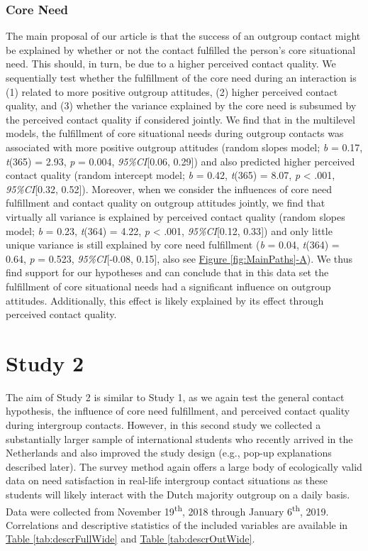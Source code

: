 \documentclass[man, 12pt, a4paper, mask]{apa7}
\theoremstyle{break}
\theoremstyle{plain}
\newcommand{\fgrref}[2][]{\hyperref[#2]{Figure \ref*{#2}#1}}
\newcommand{\tblref}[2][]{\hyperref[#2]{Table \ref*{#2}#1}}
\begin{document}
\subsubsection{Core Need}

The main proposal of our article is that the success of an outgroup
contact might be explained by whether or not the contact fulfilled the
person's core situational need. This should, in turn, be due to a higher
perceived contact quality. We sequentially test whether the fulfillment
of the core need during an interaction is (1) related to more positive
outgroup attitudes, (2) higher perceived contact quality, and (3)
whether the variance explained by the core need is subsumed by the
perceived contact quality if considered jointly. We find that in the
multilevel models, the fulfillment of core situational needs during
outgroup contacts was associated with more positive outgroup attitudes
(random slopes model; \textit{b} = 0.17, \textit{t}(365) = 2.93,
\textit{p} = 0.004, \textit{95\%CI}{[}0.06, 0.29{]}) and also predicted
higher perceived contact quality (random intercept model; \textit{b} =
0.42, \textit{t}(365) = 8.07, \textit{p} \textless{} .001,
\textit{95\%CI}{[}0.32, 0.52{]}). Moreover, when we consider the
influences of core need fulfillment and contact quality on outgroup
attitudes jointly, we find that virtually all variance is explained by
perceived contact quality (random slopes model; \textit{b} = 0.23,
\textit{t}(364) = 4.22, \textit{p} \textless{} .001,
\textit{95\%CI}{[}0.12, 0.33{]}) and only little unique variance is
still explained by core need fulfillment (\textit{b} = 0.04,
\textit{t}(364) = 0.64, \textit{p} = 0.523, \textit{95\%CI}{[}-0.08,
0.15{]}, also see \fgrref[-A]{fig:MainPaths}). We thus find support for
our hypotheses and can conclude that in this data set the fulfillment of
core situational needs had a significant influence on outgroup
attitudes. Additionally, this effect is likely explained by its effect
through perceived contact quality.

\section{Study 2}

The aim of Study 2 is similar to Study 1, as we again test the general
contact hypothesis, the influence of core need fulfillment, and
perceived contact quality during intergroup contacts. However, in this
second study we collected a substantially larger sample of international
students who recently arrived in the Netherlands and also improved the
study design (e.g., pop-up explanations described later). The survey
method again offers a large body of ecologically valid data on need
satisfaction in real-life intergroup contact situations as these
students will likely interact with the Dutch majority outgroup on a
daily basis. Data were collected from November 19\textsuperscript{th},
2018 through January 6\textsuperscript{th}, 2019. Correlations and
descriptive statistics of the included variables are available in
\tblref{tab:descrFullWide} and \tblref{tab:descrOutWide}.
\end{document}
